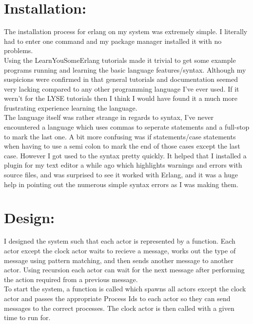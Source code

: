 \documentclass[fleqn]{report}
\begin{document}
\section*{Installation:}

The installation process for erlang on my system was extremely simple.
I literally had to enter one command and my package manager installed it with
no problems.\\ 

Using the LearnYouSomeErlang tutorials made it trivial to get some example
programs running and learning the basic language features/syntax. 
Although my suspicions were confirmed in that general tutorials and documentation seemed 
very lacking compared to any other programming language I've ever used. 
If it wern't for the LYSE tutorials then I think I would have found it a much more
frustrating experience learning the language.\\  

The language itself was rather strange in regards to syntax, 
I've never encountered a language which uses
commas to seperate statements and a full-stop to mark the last one. A bit more confusing was
if statements/case statements when having to use a semi colon to mark the end of those cases
except the last case. However I got used to the syntax pretty quickly.
It helped that I installed a plugin for my text editor a while ago which highlights warnings
and errors with source files, and was surprised to see it worked with Erlang, and it was
a huge help in pointing out the numerous simple syntax errors as I was making them.

\section*{Design:}

I designed the system such that each actor is represented by a function. Each actor
except the clock actor waits to recieve a message, works out the type of message
using pattern matching, and then sends another message to another actor. Using 
recursion each actor can wait for the next message after performing the action
required from a previous message.\\

To start the system, a function is called which spawns all actors except the clock actor
and passes the appropriate Process Ids to each actor so they can send messages
to the correct processes. The clock actor is then called with a given time to run for.\\
\end{document}

